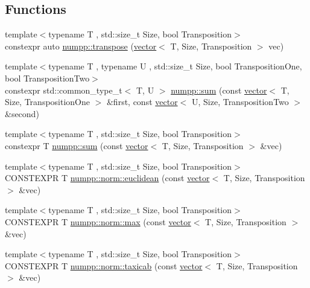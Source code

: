 \subsection*{Functions}
\begin{DoxyCompactItemize}
\item 
{\footnotesize template$<$typename T , std\+::size\+\_\+t Size, bool Transposition$>$ }\\constexpr auto \hyperlink{group__numpp__structures__vector_gab3289765a30dd71552bb3735d1eed2cb}{numpp\+::transpose} (\hyperlink{classnumpp_1_1vector}{vector}$<$ T, Size, Transposition $>$ vec)
\item 
{\footnotesize template$<$typename T , typename U , std\+::size\+\_\+t Size, bool Transposition\+One, bool Transposition\+Two$>$ }\\constexpr std\+::common\+\_\+type\+\_\+t$<$ T, U $>$ \hyperlink{group__numpp__structures__vector_ga14b45cfacf9d631e87eb16702849698b}{numpp\+::sum} (const \hyperlink{classnumpp_1_1vector}{vector}$<$ T, Size, Transposition\+One $>$ \&first, const \hyperlink{classnumpp_1_1vector}{vector}$<$ U, Size, Transposition\+Two $>$ \&second)
\item 
{\footnotesize template$<$typename T , std\+::size\+\_\+t Size, bool Transposition$>$ }\\constexpr T \hyperlink{group__numpp__structures__vector_ga433e83681dca06467aaa4960cb631c79}{numpp\+::sum} (const \hyperlink{classnumpp_1_1vector}{vector}$<$ T, Size, Transposition $>$ \&vec)
\item 
{\footnotesize template$<$typename T , std\+::size\+\_\+t Size, bool Transposition$>$ }\\C\+O\+N\+S\+T\+E\+X\+PR T \hyperlink{group__numpp__structures__vector_ga0a9e277caa2ef944ec7f28a794523a19}{numpp\+::norm\+::euclidean} (const \hyperlink{classnumpp_1_1vector}{vector}$<$ T, Size, Transposition $>$ \&vec)
\item 
{\footnotesize template$<$typename T , std\+::size\+\_\+t Size, bool Transposition$>$ }\\C\+O\+N\+S\+T\+E\+X\+PR T \hyperlink{group__numpp__structures__vector_ga4847adde1fdd241339308615285974ad}{numpp\+::norm\+::max} (const \hyperlink{classnumpp_1_1vector}{vector}$<$ T, Size, Transposition $>$ \&vec)
\item 
{\footnotesize template$<$typename T , std\+::size\+\_\+t Size, bool Transposition$>$ }\\C\+O\+N\+S\+T\+E\+X\+PR T \hyperlink{group__numpp__structures__vector_ga51b9bb12dcc29ec7b36896742be8438c}{numpp\+::norm\+::taxicab} (const \hyperlink{classnumpp_1_1vector}{vector}$<$ T, Size, Transposition $>$ \&vec)

\end{DoxyCompactItemize}

